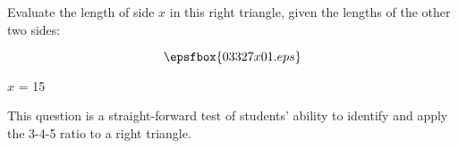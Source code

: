 

Evaluate the length of side $x$ in this right triangle, given the lengths of the other two sides:

$$\epsfbox{03327x01.eps}$$







$x$ = 15







This question is a straight-forward test of students' ability to identify and apply the 3-4-5 ratio to a right triangle.




